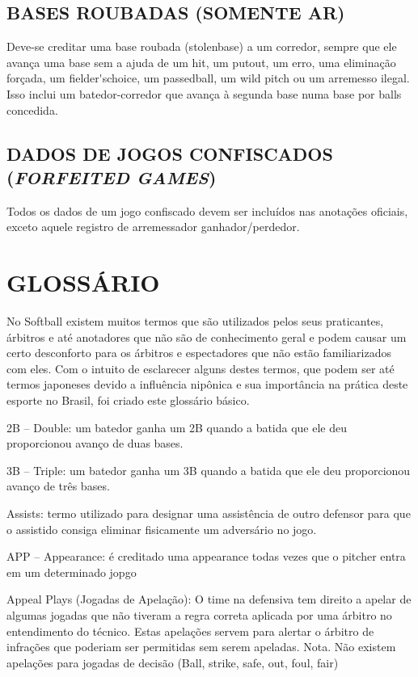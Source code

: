 	\section{BASES ROUBADAS (SOMENTE AR)}

			Deve-se creditar uma base roubada (\gls{stolenbase}) a um corredor, sempre que ele avança uma base sem a ajuda de um \gls{hit}, um \gls{putout}, um erro, uma eliminação forçada, um \gls{fielder'schoice}, um \gls{passedball}, um \gls{wild pitch} ou um arremesso ilegal. Isso inclui um batedor-corredor que avança à segunda base numa base por \glspl{ball} concedida.

	\section{DADOS DE JOGOS CONFISCADOS (\textit{FORFEITED GAMES})}

 	Todos os dados de um jogo confiscado devem ser incluídos nas anotações oficiais, exceto aquele registro de arremessador ganhador/perdedor.

\chapter*{GLOSSÁRIO}

No Softball existem muitos termos que são utilizados pelos seus praticantes, árbitros e até anotadores que não são de conhecimento geral e podem causar um certo desconforto para os árbitros e espectadores que não estão familiarizados com eles. Com o intuito de esclarecer alguns destes termos, que podem ser até termos japoneses devido a influência nipônica e sua importância na prática deste esporte no Brasil, foi criado este glossário básico.

 2B -- Double: um batedor ganha um 2B quando a batida que ele deu proporcionou avanço de duas bases.

 3B -- Triple: um batedor ganha um 3B quando a batida que ele deu proporcionou avanço de três bases.

 Assists: termo utilizado para designar uma assistência de outro defensor para que o assistido consiga eliminar fisicamente um adversário no jogo.

 APP -- Appearance: é creditado uma appearance todas vezes que o pitcher entra em um determinado jopgo

Appeal Plays (Jogadas de Apelação): O time na defensiva tem direito a apelar de algumas jogadas que não tiveram a regra correta aplicada por uma árbitro no entendimento do técnico. Estas apelações servem para alertar o árbitro de infrações que poderiam ser permitidas sem serem apeladas. Nota. Não existem apelações para jogadas de decisão (Ball, strike, safe, out, foul, fair)

